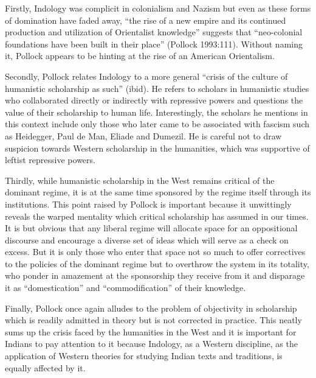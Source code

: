 Firstly, Indology was complicit in colonialism and Nazism but even as these forms of domination have faded away, “the rise of a new empire and its continued production and utilization of Orientalist knowledge” suggests that “neo-colonial foundations have been built in their place” (Pollock 1993:111). Without naming it, Pollock appears to be hinting at the rise of an American Orientalism. 
\vskip 2pt

Secondly, Pollock relates Indology to a more general “crisis of the culture of humanistic scholarship as such” (ibid). He refers to scholars in humanistic studies who collaborated directly or indirectly with repressive powers and questions the value of their scholarship to human life. Interestingly, the scholars he mentions in this context include only those who later came to be associated with fascism such as Heidegger, Paul de Man, Eliade and Dumezil. He is careful not to draw suspicion towards Western scholarship in the humanities, which was supportive of leftist repressive powers. 

Thirdly, while humanistic scholarship in the West remains critical of the dominant regime, it is at the same time sponsored by the regime itself through its institutions. This point raised by Pollock is important because it unwittingly reveals the warped mentality which critical scholarship has assumed in our times. It is but obvious that any liberal regime will allocate space for an oppositional discourse and encourage a diverse set of ideas which will serve as a check on excess. But it is only those who enter that space not so much to offer correctives to the policies of the dominant regime but to overthrow the system in its totality, who ponder in amazement at the sponsorship they receive from it and disparage it as “domestication” and “commodification” of their knowledge. 


Finally, Pollock once again alludes to the problem of objectivity in scholarship which is readily admitted in theory but is not corrected in practice. This neatly sums up the crisis faced by the humanities in the West and it is important for Indians to pay attention to it because Indology, as a Western discipline, as the application of Western theories for studying Indian texts and traditions, is equally affected by it.

